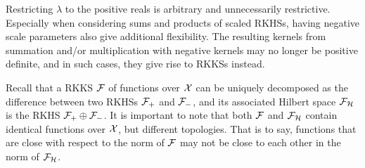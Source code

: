 Restricting $\lambda$ to the positive reals is arbitrary and unnecessarily restrictive.
Especially when considering sums and products of scaled RKHSs, having negative scale parameters also give additional flexibility.
The resulting kernels from summation and/or multiplication with negative kernels may no longer be positive definite, and in such cases, they give rise to RKKSs instead.

\begin{remark}
  Recall that a RKKS ${\mathcal F}$ of functions over ${\mathcal X}$ can be uniquely decomposed as the difference between two RKHSs ${\mathcal F}_+$ and ${\mathcal F}_-$, and its associated Hilbert space ${\mathcal F}_{\mathcal H}$ is the RKHS ${\mathcal F}_+ \oplus {\mathcal F}_-$.
  It is important to note that both ${\mathcal F}$ and ${\mathcal F}_{\mathcal H}$ contain identical functions over ${\mathcal X}$, but different topologies.
  That is to say, functions that are close with respect to the norm of ${\mathcal F}$ may not be close to each other in the norm of ${\mathcal F}_{\mathcal H}$.
\end{remark}


